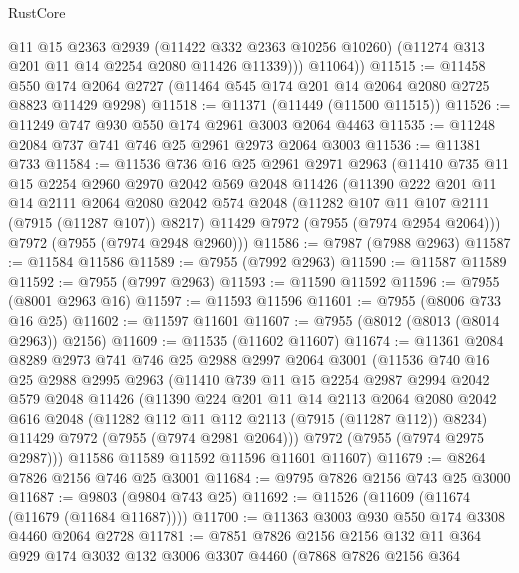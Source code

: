 \begin{lexlean}{RustCore}
\begin{coremodule}
            @11
            @15
            @2363
            @2939
            (@11422 @332 @2363 @10256 @10260)
            (@11274 @313 @201 @11 @14 @2254 @2080 @11426 @11339)))
        @11064))
@11515 := @11458
    @550
    @174
    @2064
    @2727
    (@11464 @545 @174 @201 @14 @2064 @2080 @2725 @8823 @11429 @9298)
@11518 := @11371 (@11449 (@11500 @11515))
@11526 := @11249 @747 @930 @550 @174 @2961 @3003 @2064 @4463
@11535 := @11248 @2084 @737 @741 @746 @25 @2961 @2973 @2064 @3003
@11536 := @11381 @733
@11584 := @11536
    @736
    @16
    @25
    @2961
    @2971
    @2963
    (@11410
      @735
      @11
      @15
      @2254
      @2960
      @2970
      @2042
      @569
      @2048
      @11426
      (@11390
        @222
        @201
        @11
        @14
        @2111
        @2064
        @2080
        @2042
        @574
        @2048
        (@11282 @107 @11 @107 @2111 (@7915 (@11287 @107)) @8217)
        @11429
        @7972
        (@7955 (@7974 @2954 @2064)))
      @7972
      (@7955 (@7974 @2948 @2960)))
@11586 := @7987 (@7988 @2963)
@11587 := @11584 @11586
@11589 := @7955 (@7992 @2963)
@11590 := @11587 @11589
@11592 := @7955 (@7997 @2963)
@11593 := @11590 @11592
@11596 := @7955 (@8001 @2963 @16)
@11597 := @11593 @11596
@11601 := @7955 (@8006 @733 @16 @25)
@11602 := @11597 @11601
@11607 := @7955 (@8012 (@8013 (@8014 @2963)) @2156)
@11609 := @11535 (@11602 @11607)
@11674 := @11361
    @2084
    @8289
    @2973
    @741
    @746
    @25
    @2988
    @2997
    @2064
    @3001
    (@11536
      @740
      @16
      @25
      @2988
      @2995
      @2963
      (@11410
        @739
        @11
        @15
        @2254
        @2987
        @2994
        @2042
        @579
        @2048
        @11426
        (@11390
          @224
          @201
          @11
          @14
          @2113
          @2064
          @2080
          @2042
          @616
          @2048
          (@11282 @112 @11 @112 @2113 (@7915 (@11287 @112)) @8234)
          @11429
          @7972
          (@7955 (@7974 @2981 @2064)))
        @7972
        (@7955 (@7974 @2975 @2987)))
      @11586
      @11589
      @11592
      @11596
      @11601
      @11607)
@11679 := @8264 @7826 @2156 @746 @25 @3001
@11684 := @9795 @7826 @2156 @743 @25 @3000
@11687 := @9803 (@9804 @743 @25)
@11692 := @11526 (@11609 (@11674 (@11679 (@11684 @11687))))
@11700 := @11363 @3003 @930 @550 @174 @3308 @4460 @2064 @2728
@11781 := @7851
    @7826
    @2156
    @2156
    @132
    @11
    @364
    @929
    @174
    @3032
    @132
    @3006
    @3307
    @4460
    (@7868
      @7826
      @2156
      @364

\end{coremodule}
\end{lexlean}
